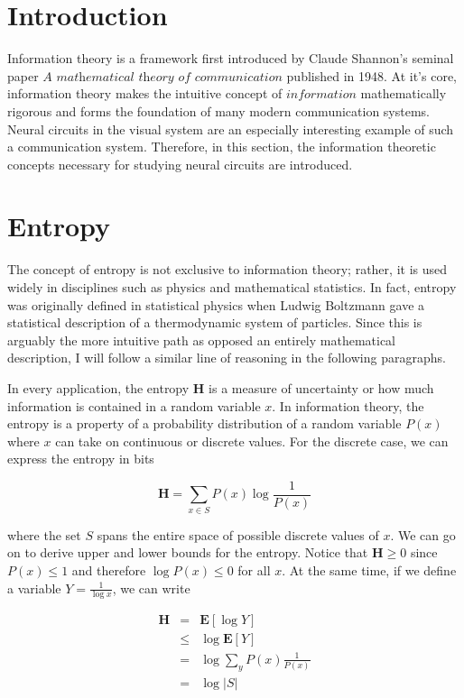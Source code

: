 \documentclass[a4paper,11pt]{book}
\begin{document}
\section{Introduction}

Information theory is a framework first introduced by Claude Shannon's seminal paper $\textit{A mathematical theory of communication}$  published in 1948. At it's core, information theory makes the intuitive concept of $\textit{information}$ mathematically rigorous and forms the foundation of many modern communication systems. Neural circuits in the visual system are an especially interesting example of such a communication system. Therefore, in this section, the information theoretic concepts necessary for studying neural circuits are introduced. 

\section{Entropy}

The concept of entropy is not exclusive to information theory; rather, it is used widely in disciplines such as physics and mathematical statistics. In fact, entropy was originally defined in statistical physics when Ludwig Boltzmann gave a statistical description of a thermodynamic system of particles. Since this is arguably the more intuitive path as opposed an entirely mathematical description, I will follow a similar line of reasoning in the following paragraphs.

In every application, the entropy $\mathbf{H}$ is a measure of uncertainty or how much information is contained in a random variable $x$. In information theory, the entropy is a property of a probability distribution of a random variable $P(x)$ where $x$ can take on continuous or discrete values. For the discrete case, we can express the entropy in bits 

\begin{equation}
\textbf{H} = \sum_{x\in S} P(x)\log\frac{1}{P(x)}
\end{equation}

where the set $S$ spans the entire space of possible discrete values of $x$. We can go on to derive upper and lower bounds for the entropy. Notice that $\mathbf{H} \geq 0$ since $P(x) \leq 1$ and therefore $\log P(x) \leq 0$  for all $x$. At the same time, if we define a variable $Y = \frac{1}{\log x}$, we can write

\begin{eqnarray*}
\textbf{H} &=& \mathbf{E}[\log Y]\\
&\leq & \log \mathbf{E}[Y]\\
&=& \log \sum_{y}P(x) \frac{1}{P(x)}\\
&=& \log |S|
\end{eqnarray*}
\end{document}
